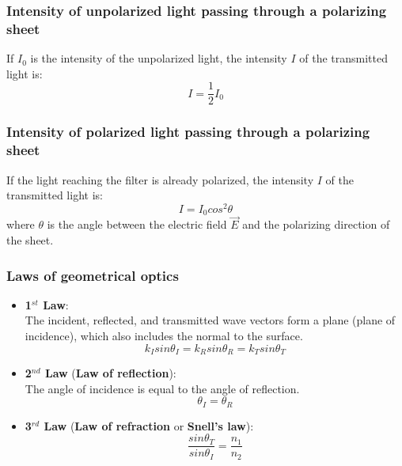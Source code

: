 \documentclass[english,11pt]{article}
\begin{document}
\subsubsection*{\bf Intensity of unpolarized light passing through a polarizing sheet}
If $I_0$ is the intensity of the unpolarized light,
the intensity $I$ of the transmitted light is:
\begin{equation*}
  I = \frac{1}{2}I_0
\end{equation*}


\subsubsection*{\bf Intensity of polarized light passing through a polarizing sheet}
If the light reaching the filter is already polarized,
the intensity $I$ of the transmitted light is:
\begin{equation*}
  I = I_0 cos^2\theta
\end{equation*}
where $\theta$ is the angle between the electric field $\vec{E}$
and the polarizing direction of the sheet.

\subsubsection*{\bf Laws of geometrical optics}
\begin{itemize}
  \item {\bf 1$^{st}$ Law}:\\
     The incident, reflected, and transmitted wave vectors form a plane (plane of incidence),
     which also includes the normal to the surface.
     \begin{equation*}
          k_I sin\theta_I = k_R sin\theta_R = k_T sin\theta_T
      \end{equation*}
  \item {\bf 2$^{nd}$ Law} ({\bf Law of reflection}):\\
     The angle of incidence is equal to the angle of reflection.
     \begin{equation*}
          \theta_I = \theta_R
      \end{equation*}
  \item {\bf 3$^{rd}$ Law} ({\bf Law of refraction} or {\bf Snell's law}):\\
     \begin{equation*}
          \frac{sin\theta_T}{sin\theta_I} = \frac{n_1}{n_2}
      \end{equation*}
\end{itemize}
\end{document}
